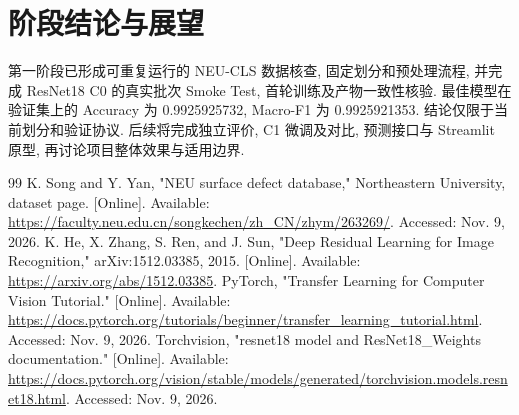\documentclass[letterpaper, 10 pt, conference]{ieeeconf}
\begin{document}
\section{阶段结论与展望}
第一阶段已形成可重复运行的 NEU-CLS 数据核查, 固定划分和预处理流程, 并完成 ResNet18 C0 的真实批次 Smoke Test, 首轮训练及产物一致性核验. 最佳模型在验证集上的 Accuracy 为 0.9925925732, Macro-F1 为 0.9925921353. 结论仅限于当前划分和验证协议. 后续将完成独立评价, C1 微调及对比, 预测接口与 Streamlit 原型, 再讨论项目整体效果与适用边界.

\begin{thebibliography}{99}
 K. Song and Y. Yan, "NEU surface defect database," Northeastern University, dataset page. [Online]. Available: \url{https://faculty.neu.edu.cn/songkechen/zh_CN/zhym/263269/}. Accessed: Nov. 9, 2026.
 K. He, X. Zhang, S. Ren, and J. Sun, "Deep Residual Learning for Image Recognition," arXiv:1512.03385, 2015. [Online]. Available: \url{https://arxiv.org/abs/1512.03385}.
 PyTorch, "Transfer Learning for Computer Vision Tutorial." [Online]. Available: \url{https://docs.pytorch.org/tutorials/beginner/transfer_learning_tutorial.html}. Accessed: Nov. 9, 2026.
 Torchvision, "resnet18 model and ResNet18\_Weights documentation." [Online]. Available: \url{https://docs.pytorch.org/vision/stable/models/generated/torchvision.models.resnet18.html}. Accessed: Nov. 9, 2026.
\end{thebibliography}
\end{document}
